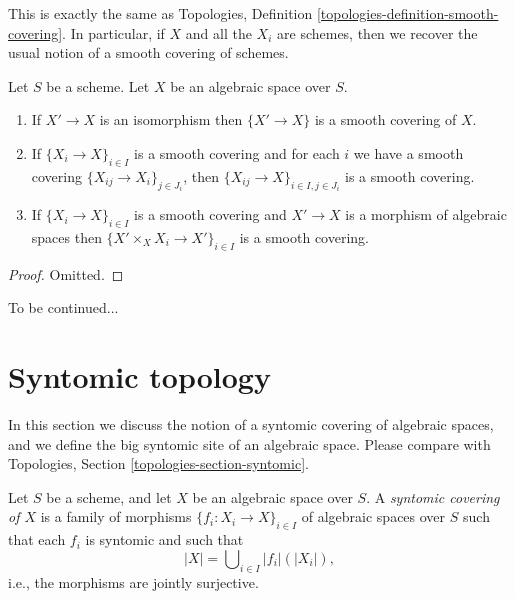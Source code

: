 \noindent
This is exactly the same as
Topologies, Definition \ref{topologies-definition-smooth-covering}.
In particular, if $X$ and all the $X_i$ are schemes, then we recover the
usual notion of a smooth covering of schemes.

\begin{lemma}
\label{lemma-smooth}
Let $S$ be a scheme.
Let $X$ be an algebraic space over $S$.
\begin{enumerate}
\item If $X' \to X$ is an isomorphism then $\{X' \to X\}$
is a smooth covering of $X$.
\item If $\{X_i \to X\}_{i\in I}$ is a smooth covering and for each
$i$ we have a smooth covering $\{X_{ij} \to X_i\}_{j\in J_i}$, then
$\{X_{ij} \to X\}_{i \in I, j\in J_i}$ is a smooth covering.
\item If $\{X_i \to X\}_{i\in I}$ is a smooth covering
and $X' \to X$ is a morphism of algebraic spaces then
$\{X' \times_X X_i \to X'\}_{i\in I}$ is a smooth covering.
\end{enumerate}
\end{lemma}

\begin{proof}
Omitted.
\end{proof}

\noindent
To be continued...









\section{Syntomic topology}
\label{section-syntomic}

\noindent
In this section we discuss the notion of a syntomic covering of
algebraic spaces, and we define the big syntomic site of an
algebraic space. Please compare with
Topologies, Section \ref{topologies-section-syntomic}.

\begin{definition}
\label{definition-syntomic-covering}
Let $S$ be a scheme, and let $X$ be an algebraic space over $S$.
A {\it syntomic covering of $X$} is a family of morphisms
$\{f_i : X_i \to X\}_{i \in I}$ of algebraic spaces over $S$
such that each $f_i$ is syntomic
and such that
$$
|X| = \bigcup\nolimits_{i \in I} |f_i|(|X_i|),
$$
i.e., the morphisms are jointly surjective.
\end{definition}

